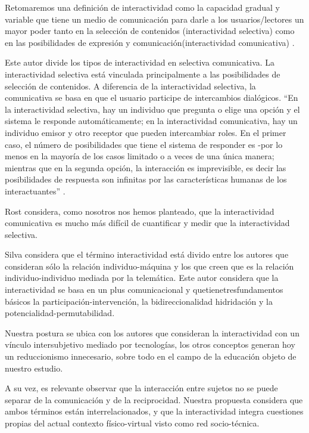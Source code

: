 \begin{defi} [Interactividad]
Retomaremos una definición de interactividad como la capacidad gradual y
variable que tiene un medio de comunicación para darle a los usuarios/lectores
un mayor poder tanto en la selección de contenidos (interactividad selectiva)
como en las posibilidades de expresión y comunicación(interactividad
comunicativa) \cite{lxxiv}.
\end{defi} 


Este autor divide los tipos de interactividad en selectiva comunicativa. La
interactividad selectiva está vinculada principalmente a las posibilidades de
selección de contenidos. A diferencia de la interactividad selectiva, la
comunicativa se basa en que el usuario participe de intercambios dialógicos. “En
la interactividad selectiva, hay un individuo que pregunta o elige una opción y
el sistema le responde automáticamente; en la interactividad comunicativa, hay
un individuo emisor y otro receptor que pueden intercambiar roles. En el primer
caso, el número de posibilidades que tiene el sistema de responder es -por lo
menos en la mayoría de los casos limitado o a veces de una única manera;
mientras que en la segunda opción, la interacción es imprevisible, es decir las
posibilidades de respuesta son infinitas por las características humanas de los
interactuantes” \cite{lxxiv}.

Rost considera, como nosotros nos hemos planteado, que la interactividad
comunicativa es mucho más difícil de cuantificar y medir que la interactividad
selectiva.

Silva \cite{lxxvi} considera que el término interactividad está divido entre los
autores que consideran sólo la relación individuo-máquina y los que creen que es
la relación individuo-individuo mediada por la telemática. Este autor considera
que la interactividad se basa en un plus comunicacional y
quetienetresfundamentos básicos la participación-intervención,
la bidireccionalidad  hidridación y la potencialidad-permutabilidad.

Nuestra postura se ubica con los autores que consideran la interactividad
con un vínculo intersubjetivo mediado por tecnologías, los otros conceptos
generan hoy un reduccionismo innecesario, sobre todo en el campo de la
educación objeto de nuestro estudio.

A su vez, es relevante observar que la interacción entre sujetos no se
puede separar de la comunicación y de la reciprocidad. Nuestra propuesta
considera que ambos términos están interrelacionados, y que la interactividad
integra cuestiones propias del actual contexto físico-virtual visto como red
socio-técnica.

